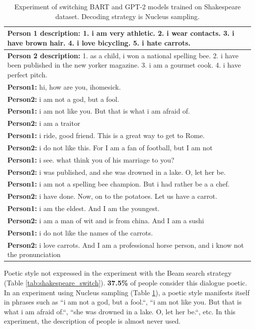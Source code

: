 \begin{table}[H]
\centering
 \begin{tabular}{|p{14cm}|} 
 \hline
 \textbf{Person 1 description:} 1. i am very athletic. 2. i wear contacts. 3. i have brown hair. 4. i love bicycling. 5. i hate carrots. \\
 \hline
 \textbf{Person 2 description:} 1. as a child, i won a national spelling bee. 2. i have been published in the new yorker magazine. 3. i am a gourmet cook. 4. i have perfect pitch. \\
 \hline
 \textbf{Person1:} hi, how are you, ihomesick. \\
 \textbf{Person2:} i am not a god, but a fool. \\ 
 \textbf{Person1:} i am not like you. But that is what i am afraid of. \\
 \textbf{Person2:} i am a traitor \\
 \textbf{Person1:} i ride, good friend. This is a great way to get to Rome. \\
 \textbf{Person2:} i do not like this. For I am a fan of football, but I am not \\
 \textbf{Person1:} i see. what think you of his marriage to you? \\
 \textbf{Person2:} i was published, and she was drowned in a lake. O, let her be.\\
 \textbf{Person1:} i am not a spelling bee champion. But i had rather be a a chef. \\
 \textbf{Person2:} i have done. Now, on to the potatoes. Let us have a carrot. \\
 \textbf{Person1:} i am the eldest. And I am the youngest. \\
 \textbf{Person2:} i am a man of wit and is from china. And I am a sushi \\
 \textbf{Person1:} i do not like the names of the carrots. \\
 \textbf{Person2:} i love carrots. And I am a professional horse person, and i know not the pronunciation \\
 \hline
 \end{tabular}
 \caption{Experiment of switching BART and GPT-2 models trained on Shakespeare dataset. Decoding strategy is Nucleus sampling.}
\label{tab:shakespeare_switch_nucleus}
\end{table}

Poetic style not expressed in the experiment with the Beam search strategy (Table \ref{tab:shakespeare_switch}). \textbf{37.5\%} of people consider this dialogue poetic. In an experiment using Nucleus sampling (Table \ref{tab:shakespeare_switch_nucleus}), a poetic style manifests itself in phrases such as ``i am not a god, but a fool.``, ``i am not like you. But that is what i am afraid of.``, ``she was drowned in a lake. O, let her be.``, etc. In this experiment, the description of people is almost never used. 

